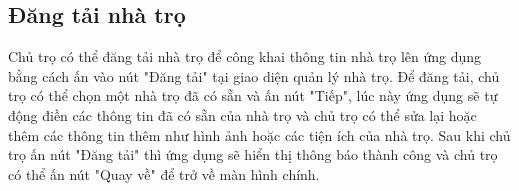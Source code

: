 \subsection{Đăng tải nhà trọ}
Chủ trọ có thể đăng tải nhà trọ để công khai thông tin nhà trọ lên ứng dụng bằng cách ấn vào nút "Đăng tải" tại giao diện quản lý nhà trọ. Để đăng tải, chủ trọ có thể chọn một nhà trọ đã có sẵn và ấn nút "Tiếp", lúc này ứng dụng sẽ tự động điền các thông tin đã có sẵn của nhà trọ và chủ trọ có thể sửa lại hoặc thêm các thông tin thêm như hình ảnh hoặc các tiện ích của nhà trọ. Sau khi chủ trọ ấn nút "Đăng tải" thì ứng dụng sẽ hiển thị thông báo thành công và chủ trọ có thể ấn nút "Quay về" để trở về màn hình chính.
\begin{figure}[!htb]
\centering
   \begin{minipage}{0.32\textwidth}
     \centering

\end{minipage}
\end{figure}
